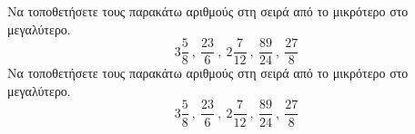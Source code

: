 Να τοποθετήσετε τους παρακάτω αριθμούς στη σειρά από το μικρότερο στο μεγαλύτερο.
\[ 3\frac{5}{8}\ ,\ \frac{23}{6}\ ,\ 2\frac{7}{12}\ ,\ \frac{89}{24}\ ,\ \dfrac{27}{8} \]
Να τοποθετήσετε τους παρακάτω αριθμούς στη σειρά από το μικρότερο στο μεγαλύτερο.
\[ 3\frac{5}{8}\ ,\ \frac{23}{6}\ ,\ 2\frac{7}{12}\ ,\ \frac{89}{24}\ ,\ \dfrac{27}{8} \]
